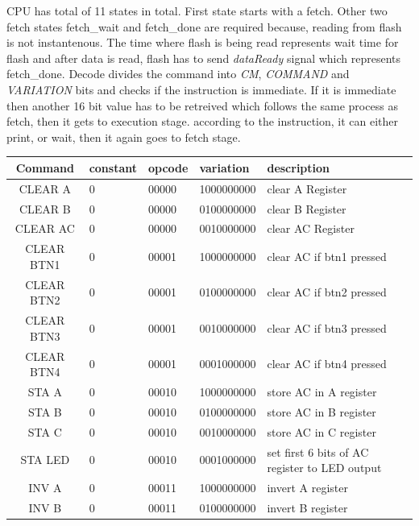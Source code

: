 \documentclass[a4paper,12pt]{article}
\begin{document}
    CPU has total of 11 states in total. First state starts with a fetch. Other two fetch states fetch\_wait and fetch\_done are required because, reading from flash is not instantenous. The time where flash is being read represents wait time for flash and after data is read, flash has to send \textit{dataReady} signal which represents fetch\_done. Decode divides the command into \textit{CM}, \textit{COMMAND} and \textit{VARIATION} bits and checks if the instruction is immediate. If it is immediate then another 16 bit value has to be retreived which follows the same process as fetch, then it gets to execution stage. according to the instruction, it can either print, or wait, then it again goes to fetch stage.

    \begin{table}[h]
    \footnotesize
    \centering
    \setlength{\tabcolsep}{0.5em} %
    {\renewcommand{\arraystretch}{1}%
    \begin{tabular}{|c|l|l|l|p{6cm}|}
    \hline
    \textbf{Command} & constant & opcode & variation & description \\ \hline
    CLEAR A & 0 & 00000 & 1000000000 & clear A Register \\ \hline
    CLEAR B & 0 & 00000 & 0100000000 & clear B Register\\ \hline
    CLEAR AC & 0 & 00000 & 0010000000 & clear AC Register\\ \hline
    CLEAR BTN1 & 0 & 00001 & 1000000000 & clear AC if btn1 pressed\\ \hline
    CLEAR BTN2 & 0 & 00001 & 0100000000 & clear AC if btn2 pressed\\ \hline
    CLEAR BTN3 & 0 & 00001 & 0010000000 & clear AC if btn3 pressed\\ \hline
    CLEAR BTN4 & 0 & 00001 & 0001000000 & clear AC if btn4 pressed\\ \hline
    STA A & 0 & 00010 & 1000000000 & store AC in A register\\ \hline
    STA B & 0 & 00010 & 0100000000 & store AC in B register\\ \hline
    STA C & 0 & 00010 & 0010000000 & store AC in C register\\ \hline
    STA LED & 0 & 00010 & 0001000000 & set first 6 bits of AC register to LED output\\ \hline
    INV A & 0 & 00011 & 1000000000 & invert A register\\ \hline
    INV B & 0 & 00011 & 0100000000 & invert B register\\ \hline

\end{tabular}}
\end{table}
\end{document}
